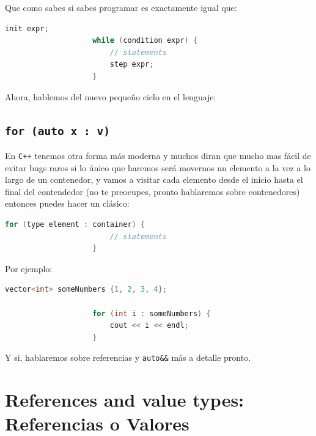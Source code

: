 \documentclass[12pt, fleqn]{report}                             %
\theoremstyle{break}                                            %
\newcommand \Cpp  {\texttt{C++} }                               %
\begin{document}
                Que como sabes si sabes programar es exactamente igual que:
                \begin{lstlisting}[language=C++, gobble=20]
                    init expr;
                    while (condition expr) {
                        // statements
                        step expr;
                    }
                \end{lstlisting}

                Ahora, hablemos del nuevo pequeño ciclo en el lenguaje:

            \subsection{\texttt{for (auto x : v)}}

                En \Cpp tenemos otra forma más moderna y muchos diran que mucho mas
                fácil de evitar bugs raros si lo único que haremos será movernos un 
                elemento a la vez a lo largo de un contenedor, y vamos a visitar cada
                elemento desde el inicio hasta el final del contendedor (no te preocupes, pronto
                hablaremos sobre contenedores) entonces puedes hacer un clásico:
                \begin{lstlisting}[language=C++, gobble=20]
                    for (type element : container) {
                        // statements
                    }
                \end{lstlisting}

                Por ejemplo:
                \begin{lstlisting}[language=C++, gobble=20]
                    vector<int> someNumbers {1, 2, 3, 4};

                    for (int i : someNumbers) {
                        cout << i << endl;
                    }
                \end{lstlisting}

                Y si, hablaremos sobre referencias y \texttt{auto\&\&} más a detalle pronto.

        \section{References and value types: Referencias o Valores}
\end{document}
